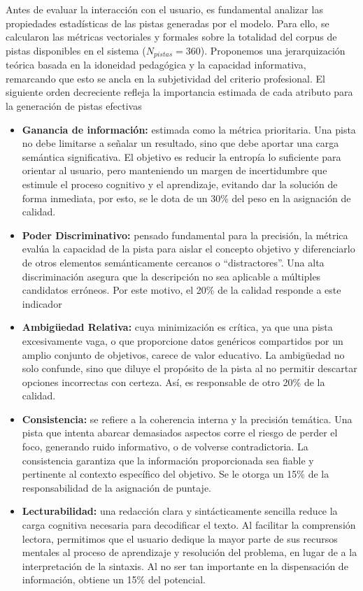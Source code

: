 \documentclass[../main.tex]{subfiles}
\begin{document}
Antes de evaluar la interacción con el usuario, es fundamental analizar las propiedades estadísticas de las pistas generadas por el modelo. Para ello, se calcularon las métricas vectoriales y formales sobre la totalidad del corpus de pistas disponibles en el sistema ($N_{pistas} = 360$). Proponemos una jerarquización teórica basada en la idoneidad pedagógica y la capacidad informativa, remarcando que esto se ancla en la subjetividad del criterio profesional. El siguiente orden decreciente refleja la importancia estimada de cada atributo para la generación de pistas efectivas

\begin{itemize}
    \item \textbf{Ganancia de información:} estimada como la métrica prioritaria. Una pista no debe limitarse a señalar un resultado, sino que debe aportar una carga semántica significativa. El objetivo es reducir la entropía lo suficiente para orientar al usuario, pero manteniendo un margen de incertidumbre que estimule el proceso cognitivo y el aprendizaje, evitando dar la solución de forma inmediata, por esto, se le dota de un 30\% del peso en la asignación de calidad.

    \item \textbf{Poder Discriminativo:} pensado fundamental para la precisión, la métrica evalúa la capacidad de la pista para aislar el concepto objetivo y diferenciarlo de otros elementos semánticamente cercanos o ``distractores''. Una alta discriminación asegura que la descripción no sea aplicable a múltiples candidatos erróneos. Por este motivo, el 20\% de la calidad responde a este indicador

    \item \textbf{Ambigüedad Relativa:} cuya minimización es crítica, ya que una pista excesivamente vaga, o que proporcione datos genéricos compartidos por un amplio conjunto de objetivos, carece de valor educativo. La ambigüedad no solo confunde, sino que diluye el propósito de la pista al no permitir descartar opciones incorrectas con certeza. Así, es responsable de otro 20\% de la calidad.

    \item \textbf{Consistencia:} se refiere a la coherencia interna y la precisión temática. Una pista que intenta abarcar demasiados aspectos corre el riesgo de perder el foco, generando ruido informativo, o de volverse contradictoria. La consistencia garantiza que la información proporcionada sea fiable y pertinente al contexto específico del objetivo. Se le otorga un 15\% de la responsabilidad de la asignación de puntaje.

    \item \textbf{Lecturabilidad:} una redacción clara y sintácticamente sencilla reduce la carga cognitiva necesaria para decodificar el texto. Al facilitar la comprensión lectora, permitimos que el usuario dedique la mayor parte de sus recursos mentales al proceso de aprendizaje y resolución del problema, en lugar de a la interpretación de la sintaxis. Al no ser tan importante en la dispensación de información, obtiene un 15\% del potencial.
\end{itemize}
\end{document}
